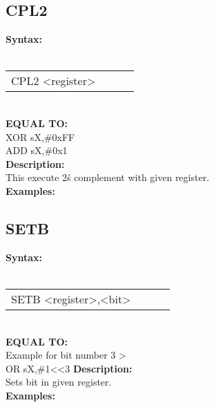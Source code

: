                 \subsection{CPL2}
                \textbf{Syntax:}\\
                \\ {
                    \texttt{}
                    \begin{tabular}[h!]{llll}
                            { \color{highlight_instruction} CPL2    } { \color{highlight_symbol} <register> }
                            { \color{highlight_comment}  }\\
                    \end{tabular}
                    }\\
                    \textbf{EQUAL TO:}\\
                    { \color{highlight_instruction} XOR    } { \color{highlight_symbol}      sX,\#0xFF }\\
                    { \color{highlight_instruction} ADD    } { \color{highlight_symbol}      sX,\#0x1 }\\
                \textbf{Description:}\\
                This execute 2\'s complement with given register.\\
                \textbf{Examples:}\\
                        \begin{code}[h!]
                            symbol}\verb'CPL2          s0' }\\
                        \end{code}

                \subsection{SETB}
                \textbf{Syntax:}\\
                \\ {
                    \texttt{}
                    \begin{tabular}[h!]{llll}
                            { \color{highlight_instruction} SETB    } { \color{highlight_symbol} <register>,<bit> }
                            { \color{highlight_comment}  }\\
                    \end{tabular}
                    }\\
                    \textbf{EQUAL TO:}\\
                    Example for bit number 3 >\\
                    { \color{highlight_instruction} OR    } { \color{highlight_symbol}      sX,\#1<<3 }
                \textbf{Description:}\\
                Sets bit in given register.\\
                \textbf{Examples:}\\
                        \begin{code}[h!]
                            symbol}\verb'SETB          s0,#3' }\\
                        \end{code}

